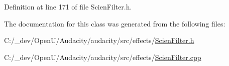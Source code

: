 Definition at line 171 of file Scien\+Filter.\+h.



The documentation for this class was generated from the following files\+:\begin{DoxyCompactItemize}
\item 
C\+:/\+\_\+dev/\+Open\+U/\+Audacity/audacity/src/effects/\hyperlink{_scien_filter_8h}{Scien\+Filter.\+h}\item 
C\+:/\+\_\+dev/\+Open\+U/\+Audacity/audacity/src/effects/\hyperlink{_scien_filter_8cpp}{Scien\+Filter.\+cpp}\end{DoxyCompactItemize}
